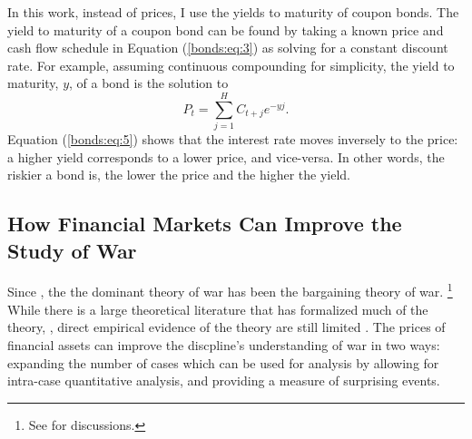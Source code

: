 In this work, instead of prices, I use the yields to maturity of coupon bonds.
The yield to maturity of a coupon bond can be found by taking a known price and cash flow schedule in Equation (\ref{bonds:eq:3}) as solving for a constant discount rate.
For example, assuming continuous compounding for simplicity, the yield to maturity, $y$, of a bond is the solution to
\begin{equation}
  \label{bonds:eq:5}
  P_{t} = \sum_{j = 1}^{H} C_{t + j} e^{-y j} \text{.}
\end{equation}
Equation (\ref{bonds:eq:5}) shows that the interest rate moves inversely to the price: a higher yield corresponds to a lower price, and vice-versa.
In other words, the riskier a bond is, the lower the price and the higher the yield.




\subsection{How Financial Markets Can Improve the Study of War}
\label{sec:how-prices-financial-1}

Since \textcite{Fearon1995}, the the dominant theory of war has been the bargaining theory of war.%
\footnote{See \textcites{Reiter2003}{Powell2006}{Reiter2009} for discussions.}
While there is a large theoretical literature that has formalized much of the theory, \parencites{FilsonWerner2002}{Slantchev2003}{SmithStam2004}{Powell2004}{LeventogluSlantchev2007}{LangloisLanglois2009}{WolfordReiterCarrubba2011}, direct empirical evidence of the theory are still limited \parencite{Reiter2009}.
The prices of financial assets can improve the discpline's understanding of war in two ways: expanding the number of cases which can be used for analysis by allowing for intra-case quantitative analysis, and providing a measure of surprising events.

